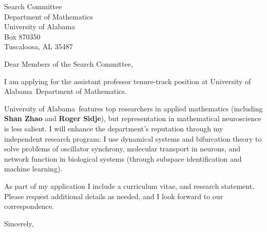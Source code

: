 \documentclass[11pt,a4paper]{letter}
\begin{document}

\def\School{University of Alabama}

\begin{letter}
{Search Committee\\
Department of Mathematics\\
University of Alabama\\
Box 870350\\
Tuscaloosa, AL 35487}


\opening{Dear Members of the Search Committee,}

I am applying for the assistant professor tenure-track position at \School~Department of Mathematics. 



\School~features top researchers in applied mathematics (including \textbf{Shan Zhao} and \textbf{Roger Sidje}), but representation in mathematical neuroscience is less salient. I will enhance the department's reputation through my independent research program: I use dynamical systems and bifurcation theory to solve problems of oscillator synchrony, molecular transport in neurons, and network function in biological systems (through subspace identification and machine learning).



As part of my application I include a curriculum vitae, and research statement. Please request additional details as needed, and I look forward to our correspondence.

\closing{Sincerely,}
\end{letter}
\end{document}
